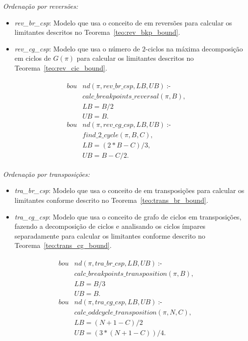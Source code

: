 \textit{Ordenação por reversões:}
\begin{itemize}
\item{\textit{rev\_br\_csp}: 
Modelo que usa o conceito de \bkp{} em reversões para calcular os
limitantes descritos no Teorema~\ref{teo:rev_bkp_bound}.}
\item{\textit{rev\_cg\_csp}:
Modelo que usa o número de $2$-ciclos na máxima decomposição em ciclos
de $G(\pi)$ para calcular os limitantes descritos no
Teorema~\ref{teo:rev_cic_bound}.}
\end{itemize}
\begin{align}
  \label{bound_rev}
  \begin{split}
  \textit{bou}&\textit{nd}(\pi, rev\_br\_csp, LB, UB)~\text{:-}  \\
  &\textit{calc\_breakpoints\_reversal}(\pi, B), \\
  &LB = B / 2  \\ %
  &UB = B.  \\
  \textit{bou}&\textit{nd}(\pi, rev\_cg\_csp, LB, UB)~\text{:-}  \\
  &\textit{find\_2\_cycle}(\pi, B, C), \\
  &LB = (2 * B - C) / 3 ,   \\
  &UB = B - C / 2.
  \end{split}
\end{align}

\textit{Ordenação por transposições:}
\begin{itemize}
\item{\textit{tra\_br\_csp}: 
Modelo que usa o conceito de \bkp{} em transposições para calcular os
limitantes conforme descrito no Teorema~\ref{teo:trans_br_bound}.}
\item{\textit{tra\_cg\_csp}:
Modelo que usa o conceito de grafo de ciclos em transposições, fazendo
a decomposição de ciclos e analisando os ciclos ímpares separadamente
para calcular os limitantes conforme descrito no
Teorema~\ref{teo:trans_cg_bound}.}
\end{itemize}
\begin{align}
  \label{bound_tra}
  \begin{split}
  \textit{bou}&\textit{nd}(\pi, tra\_br\_csp, LB, UB)~\text{:-} \\
  &\textit{calc\_breakpoints\_transposition}(\pi, B), \\
  &LB = B / 3  \\ %
  &UB = B.   \\
  \textit{bou}&\textit{nd}(\pi, tra\_cg\_csp, LB, UB)~\text{:-} \\
  &\textit{calc\_oddcycle\_transposition}(\pi, N, C), \\
  &LB = (N + 1 - C) / 2  \\ 
  &UB = (3 * (N + 1 - C)) / 4.
  \end{split}
\end{align}


